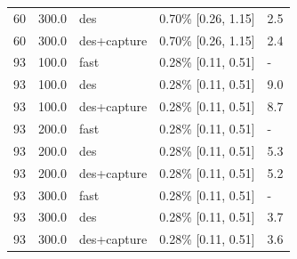 \begin{table}[t]
\begin{tabular}{lllll}
60 & 300.0 & des & 0.70\% [0.26, 1.15] & 2.5 \\
60 & 300.0 & des+capture & 0.70\% [0.26, 1.15] & 2.4 \\
93 & 100.0 & fast & 0.28\% [0.11, 0.51] & - \\
93 & 100.0 & des & 0.28\% [0.11, 0.51] & 9.0 \\
93 & 100.0 & des+capture & 0.28\% [0.11, 0.51] & 8.7 \\
93 & 200.0 & fast & 0.28\% [0.11, 0.51] & - \\
93 & 200.0 & des & 0.28\% [0.11, 0.51] & 5.3 \\
93 & 200.0 & des+capture & 0.28\% [0.11, 0.51] & 5.2 \\
93 & 300.0 & fast & 0.28\% [0.11, 0.51] & - \\
93 & 300.0 & des & 0.28\% [0.11, 0.51] & 3.7 \\
93 & 300.0 & des+capture & 0.28\% [0.11, 0.51] & 3.6 \\
\bottomrule
\end{tabular}
\end{table}
